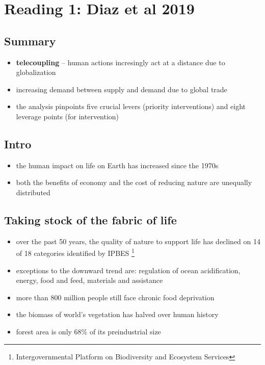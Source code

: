 \section{Reading 1: Diaz et al 2019}

\subsection{Summary}

\begin{itemize}
	\item \textbf{telecoupling} -- human actions incresingly act at a
		distance due to globalization
	\item increasing demand between supply and demand due to global trade
	\item the analysis pinpoints five crucial levers (priority
		interventions) and eight leverage points (for intervention)
\end{itemize}

\subsection{Intro}

\begin{itemize}
	\item the human impact on life on Earth has increased since the 1970s
	\item both the benefits of economy and the cost of reducing nature
		are unequally distributed
\end{itemize}

\subsection{Taking stock of the fabric of life}

\begin{itemize}
	\item over the past 50 years, the quality of nature to support life
		has declined on 14 of 18 categories identified by IPBES
		\footnote{Intergovernmental Platform on Biodiversity and
		Ecosystem Services}
	\item exceptions to the downward trend are: regulation of ocean
		acidification, energy, food and feed, materials and assistance
	\item more than 800 million people still face chronic food deprivation
	\item the biomass of world's vegetation has halved over human history
	\item forest area is only 68\% of its preindustrial size
\end{itemize}

